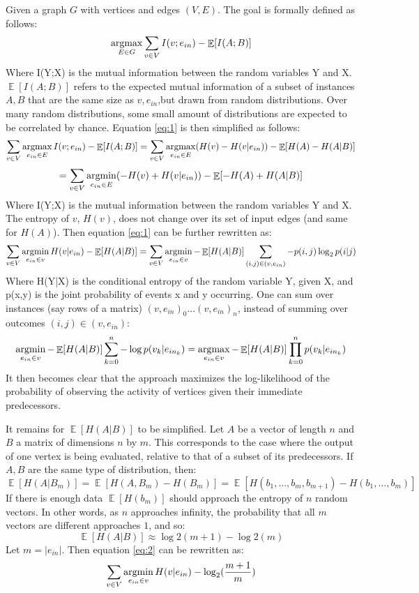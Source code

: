 \documentclass[a4paper,12pt]{book}
\newcommand{\argmax}{\operatornamewithlimits{argmax}}
\newcommand{\argmin}{\operatornamewithlimits{argmin}}
\theoremstyle{break}
\DeclareMathOperator{\EX}{\mathbb{E}}
\begin{document}
 Given a graph $G$ with vertices and edges $(V,E)$.  The goal is formally defined as follows:
 \begin{equation} \label{eq:1}
 \argmax_{E \in G} \sum_{v \in V} I(v;e_{in}) - \EX[I(A;B)]
 \end{equation}
 Where I(Y;X) is the mutual information between the random variables Y and X. $\EX[I(A;B)]$ refers to the expected mutual information of a subset of instances $A,B$ that are the same size as $v,e_{in}$,but drawn from random distributions. Over many random distributions, some small amount of distributions are expected to be correlated by chance. Equation \ref{eq:1} is then simplified as follows:
 $$\sum_{v \in V} \argmax_{e_{in} \in E} I(v;e_{in}) - \EX[I(A;B)] = \sum_{v \in V} \argmax_{e_{in} \in E} (H(v) - H(v|e_{in})) - \EX[H(A)-H(A|B)] 
 $$
 $$
 = \sum_{v \in V} \argmin_{e_{in} \in E} (- H(v) + H(v|e_{in})) - \EX[- H(A) + H(A|B)]
 $$
 Where I(Y;X) is the mutual information between the random variables Y and X. The entropy of $v$, $H(v)$, does not change over its set of input edges (and same for $H(A)$). Then equation \ref{eq:1} can be further rewritten as:
 \begin{equation} \label{eq:2}
 \sum_{v \in V} \argmin_{e_{in} \in v} H(v|e_{in}) - \EX[H(A|B)]  = \sum_{v \in V} \argmin_{e_{in} \in v} -\EX[H(A|B)]\sum_{(i,j) \in (v,e_{in})} - p(i,j)\log_2{p(i|j)}
 \end{equation} 
 Where H(Y|X) is the conditional entropy of the random variable Y, given X, and p(x,y) is the joint probability of events x and y occurring. One can sum over instances (say rows of a matrix) $(v,e_{in})_0 ...(v,e_{in})_n$, instead of summing over outcomes $(i,j) \in (v,e_{in})$:
 $$ \argmin_{e_{in} \in v} -\EX[H(A|B)] \sum_{k=0}^n - \log{p(v_k|e_{in_k})} = \argmax_{e_{in} \in v} -\EX[H(A|B)] \prod_{k=0}^n {p(v_k|e_{in_k})} $$
 It then becomes clear that the approach maximizes the log-likelihood of the probability of observing the activity of vertices given their immediate predecessors.
 
 It remains for $\EX[H(A|B)]$ to be simplified. Let $A$ be a vector of length $n$ and $B$ a matrix of dimensions $n$ by $m$. This corresponds to the case where the output of one vertex is being evaluated, relative to that of a subset of its predecessors.
 If $A,B$ are the same type of distribution, then:
 $$ \EX[H(A|B_m)] = \EX[H(A,B_m)-H(B_m)] = \EX[H(b_1,...,b_m, b_{m+1}) - H(b_1,...,b_m)] $$
 If there is enough data $\EX[H(b_m)]$ should approach the entropy of $n$ random vectors. In other words, as $n$ approaches infinity, the probability that all $m$ vectors are different approaches $1$, and so:
 $$ \EX[H(A|B)] \approx \log2(m+1) - \log2(m) $$
 Let $m = |e_{in}|$. Then equation \ref{eq:2} can be rewritten as:
 \begin{equation} \label{eq:3}
 \sum_{v \in V} \argmin_{e_{in} \in v} H(v|e_{in}) - \log_2(\frac{m+1}{m})
 \end{equation}
 
\end{document}
